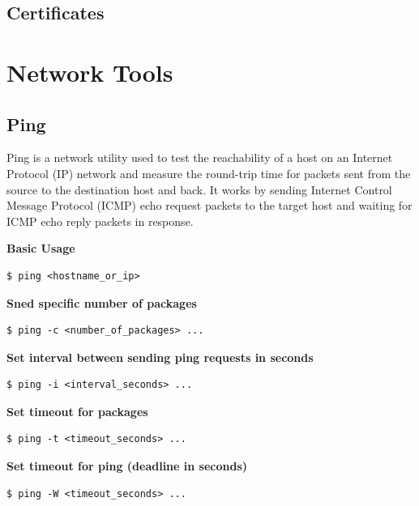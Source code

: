 \documentclass{article}
\newenvironment{codetemplate}[1][]{%
  \mybasecolorbox[#1]
  \itshape
}{%
  \endmybasecolorbox
}
\begin{document}
\subsection{Certificates}


\newpage
\section{Network Tools}

\subsection{Ping}

Ping is a network utility used to test the reachability of a host on an Internet Protocol (IP) network and measure the round-trip time for packets sent from the source to the destination host and back. It works by sending Internet Control Message Protocol (ICMP) echo request packets to the target host and waiting for ICMP echo reply packets in response.

\textbf{Basic Usage}
\begin{codetemplate}{}
\begin{verbatim}
$ ping <hostname_or_ip>
\end{verbatim}
\end{codetemplate}

\textbf{Sned specific number of packages}
\begin{codetemplate}{}
\begin{verbatim}
$ ping -c <number_of_packages> ...
\end{verbatim}
\end{codetemplate}

\textbf{Set interval between sending ping requests in seconds}
\begin{codetemplate}{}
\begin{verbatim}
$ ping -i <interval_seconds> ...
\end{verbatim}
\end{codetemplate}

\textbf{Set timeout for packages}
\begin{codetemplate}{}
\begin{verbatim}
$ ping -t <timeout_seconds> ...
\end{verbatim}
\end{codetemplate}

\textbf{Set timeout for ping (deadline in seconds)}
\begin{codetemplate}{}
\begin{verbatim}
$ ping -W <timeout_seconds> ...
\end{verbatim}
\end{codetemplate}
\end{document}
